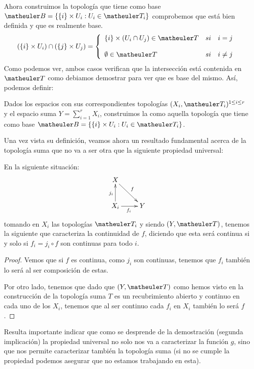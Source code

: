 Ahora construimos la topología que tiene como base $\B=\{\{i\}\times U_i:U_i\in\T_i\}$ comprobemos que está bien definida y que es realmente base.
\begin{equation}
(\{i\}\times U_i)\cap(\{j\}\times U_j)=
\left\{ \begin{array}{lcc}
\{i\}\times(U_i\cap U_j)\in\T &   si  & i=j \\
\\  \emptyset\in\T& si & i\neq j 
\end{array}
\right.
\end{equation}
Como podemos ver, ambos casos verifican que la intersección está contenida en $\T$ como debiamos demostrar para ver que es base del mismo.
Así, podemos definir:
\begin{defi}
	Dados los espacios con sus correspondientes topologías $(X_i, \T_i)^{1\le i \le r}$ y el espacio suma $Y=\sum_{i=1}^rX_i$, construimos la  como aquella topología que tiene como base $\B=\{\{i\}\times U_i:U_i\in\T_i\}$.
\end{defi}

Una vez vista su definición, veamos ahora un resultado fundamental acerca de la topología suma que no va a ser otra que la siguiente propiedad universal:

\begin{lem}
	En la siguiente situación:
	\[\xymatrix{
		X \ar[rd]^f & \\
		X_i \ar[u]^{j_i} \ar[r]_{f_i} &
		Y
	}\]
	tomando en $X_i$ las topologías $\T_i$ y siendo $(Y,\T)$, tenemos la siguiente  que caracteriza la continuidad de $f$, diciendo que esta será continua si y solo si  $f_i=j_i\circ f$ son continuas para todo $i$.
	
	\begin{proof}
		Vemos que si $f$ es continua, como $j_i$ son continuas, tenemos que $f_i$ también lo será al ser composición de estas.
		
		Por otro lado, tenemos que dado que $(Y,\T)$ como hemos visto en la construcción de la topología suma $T$ es un recubrimiento abierto y continuo en cada uno de los $X_i$, tenemos que al ser continuo cada $f_i$ en $X_i$ también lo será $f$.
	\end{proof}
\end{lem}

Resulta importante indicar que como se desprende de la demostración (segunda implicación) la propiedad universal no solo nos va a caracterizar la función $g$, sino que nos permite caracterizar también la topología suma (si no se cumple la propiedad podemos asegurar que no estamos trabajando en esta). 


